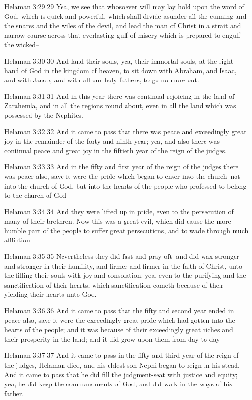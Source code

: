 Helaman 3:29
 29 Yea, we see that whosoever will may lay hold upon the word of
God, which is quick and powerful, which shall divide asunder all
the cunning and the snares and the wiles of the devil, and lead
the man of Christ in a strait and narrow course across that
everlasting gulf of misery which is prepared to engulf the
wicked--

Helaman 3:30
 30 And land their souls, yea, their immortal souls, at the right
hand of God in the kingdom of heaven, to sit down with Abraham,
and Isaac, and with Jacob, and with all our holy fathers, to go
no more out.

Helaman 3:31
 31 And in this year there was continual rejoicing in the land of
Zarahemla, and in all the regions round about, even in all the
land which was possessed by the Nephites.

Helaman 3:32
 32 And it came to pass that there was peace and exceedingly
great joy in the remainder of the forty and ninth year; yea, and
also there was continual peace and great joy in the fiftieth year
of the reign of the judges.

Helaman 3:33
 33 And in the fifty and first year of the reign of the judges
there was peace also, save it were the pride which began to enter
into the church--not into the church of God, but into the hearts
of the people who professed to belong to the church of God--

Helaman 3:34
 34 And they were lifted up in pride, even to the persecution of
many of their brethren. Now this was a great evil, which did
cause the more humble part of the people to suffer great
persecutions, and to wade through much affliction.

Helaman 3:35
 35 Nevertheless they did fast and pray oft, and did wax stronger
and stronger in their humility, and firmer and firmer in the
faith of Christ, unto the filling their souls with joy and
consolation, yea, even to the purifying and the sanctification of
their hearts, which sanctification cometh because of their
yielding their hearts unto God.

Helaman 3:36
 36 And it came to pass that the fifty and second year ended in
peace also, save it were the exceedingly great pride which had
gotten into the hearts of the people; and it was because of their
exceedingly great riches and their prosperity in the land; and it
did grow upon them from day to day.

Helaman 3:37
 37 And it came to pass in the fifty and third year of the reign
of the judges, Helaman died, and his eldest son Nephi began to
reign in his stead. And it came to pass that he did fill the
judgment-seat with justice and equity; yea, he did keep the
commandments of God, and did walk in the ways of his father.

